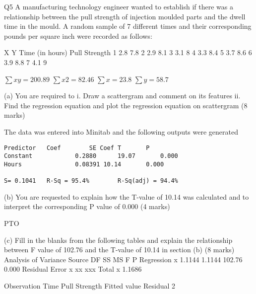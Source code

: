 
Q5
A manufacturing technology engineer wanted to establish if there was a relationship between the pull strength of injection moulded parts and the dwell time in the mould. A random sample of 7 different times and their corresponding pounds per square inch were recorded as follows:


X	Y
Time (in hours)	Pull Strength
1	2.8	7.8
2	2.9	8.1
3	3.1	8
4	3.3	8.4
5	3.7	8.6
6	3.9	8.8
7	4.1	9

$\sum xy =	200.89$	 $\sum x2 = 	82.46$	 $\sum x = 23.8$	$\sum y = 58.7$

(a) 	You are required to 
i.	Draw a scattergram and comment on its features
ii.	Find the regression equation and plot the regression equation on scattergram
(8 marks)

The data was entered into Minitab and the following outputs were generated

\begin{framed}
\begin{verbatim}
Predictor	Coef		SE Coef	T		P
Constant			0.2880		19.07		0.000
Hours				0.08391	10.14		0.000

S= 0.1041	R-Sq = 95.4%		R-Sq(adj) = 94.4%
\end{verbatim}
\end{framed}

(b) 	You are requested to explain how the T-value of 10.14 was calculated and to 
interpret the corresponding P value of 0.000
(4 marks)

PTO


(c)	Fill in the blanks from the following tables and explain the relationship between F value of 102.76 and the T-value of 10.14 in section (b)
(8 marks)
Analysis of Variance
Source			DF		SS		MS		F		P
Regression		x		1.1144		1.1144		102.76		0.000
Residual Error		x		xx		xxx		
Total			x		1.1686



Observation		Time		Pull Strength		Fitted value	Residual
2		

